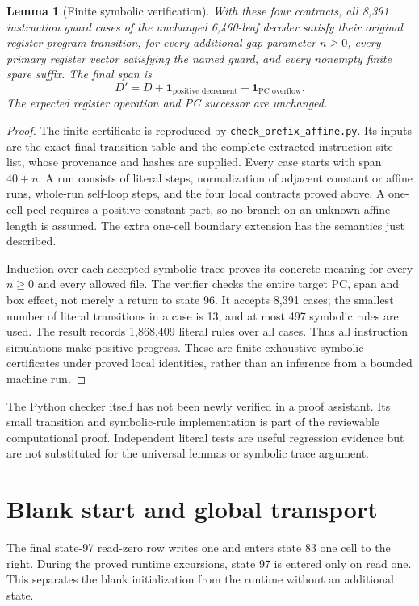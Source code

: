 \documentclass[11pt]{article}
\newtheorem{lemma}{Lemma}
\begin{document}
\begin{lemma}[Finite symbolic verification]
With these four contracts, all 8,391 instruction guard cases of the
unchanged 6,460-leaf decoder satisfy their original register-program
transition, for every additional gap parameter $n\ge0$, every primary
register vector satisfying the named guard, and every nonempty finite
spare suffix.  The final span is
\[
 D'=D+\mathbf1_{\text{positive decrement}}
       +\mathbf1_{\text{PC overflow}}.
\]
The expected register operation and PC successor are unchanged.
\end{lemma}
\begin{proof}
The finite certificate is reproduced by
\texttt{check\_prefix\_affine.py}.  Its inputs are the exact final
transition table and the complete extracted instruction-site list,
whose provenance and hashes are supplied.  Every case starts with
span $40+n$.  A run consists of literal steps, normalization of adjacent
constant or affine runs, whole-run self-loop steps, and the four local
contracts proved above.  A one-cell peel requires a positive constant
part, so no branch on an unknown affine length is assumed.  The extra
one-cell boundary extension has the semantics just described.

Induction over each accepted symbolic trace proves its concrete
meaning for every $n\ge0$ and every allowed file.  The verifier checks
the entire target PC, span and box effect, not merely a return to state
96.  It accepts 8,391 cases; the smallest number of literal transitions
in a case is 13, and at most 497 symbolic rules are used.  The result
records 1,868,409 literal rules over all cases.  Thus all instruction
simulations make positive progress.  These are finite exhaustive
symbolic certificates under proved local identities, rather than an
inference from a bounded machine run.
\end{proof}

The Python checker itself has not been newly verified in a proof
assistant.  Its small transition and symbolic-rule implementation is
part of the reviewable computational proof.  Independent literal tests
are useful regression evidence but are not substituted for the
universal lemmas or symbolic trace argument.

\section{Blank start and global transport}

The final state-97 read-zero row writes one and enters state 83 one
cell to the right.  During the proved runtime excursions, state 97 is
entered only on read one.  This separates the blank initialization from
the runtime without an additional state.
\end{document}
